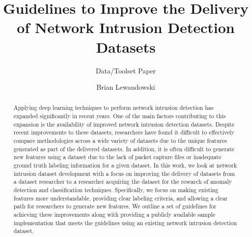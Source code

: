 \documentclass[sigconf]{acmart}
\begin{document}
\title{Guidelines to Improve the Delivery of Network Intrusion Detection Datasets}
\subtitle{Data/Toolset Paper}

\author{Brian Lewandowski}


\renewcommand{\shortauthors}{Lewandowski et al.}

\begin{abstract}
    Applying deep learning techniques to perform network intrusion detection has expanded significantly in recent years.
    One of the main factors contributing to this expansion is the availability of improved network intrusion detection datasets.
    Despite recent improvements to these datasets, researchers have found it difficult to effectively compare methodologies across a wide variety of datasets due to the unique features generated as part of the delivered datasets.
    In addition, it is often difficult to generate new features using a dataset due to the lack of packet capture files or inadequate ground truth labeling information for a given dataset.
    In this work, we look at network intrusion dataset development with a focus on improving the delivery of datasets from a dataset researcher to a researcher acquiring the dataset for the research of anomaly detection and classification techniques.
    Specifically, we focus on making existing features more understandable, providing clear labeling criteria, and allowing a clear path for researchers to generate new features.
    We outline a set of guidelines for achieving these improvements along with providing a publicly available sample implementation that meets the guidelines using an existing network intrusion detection dataset.
\end{abstract}
\end{document}
